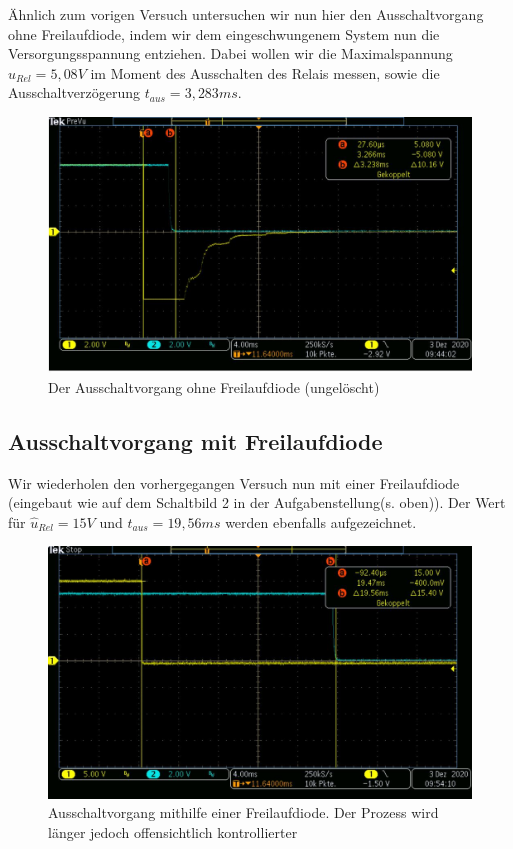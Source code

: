 \documentclass{article}
\begin{document}
Ähnlich zum vorigen Versuch untersuchen wir nun hier den Ausschaltvorgang ohne Freilaufdiode, indem wir dem eingeschwungenem System nun die 
Versorgungsspannung entziehen. Dabei wollen wir die Maximalspannung $\hat{u}_{Rel} = 5,08V$ im Moment des Ausschalten des Relais messen, sowie die Ausschaltverzögerung
$t_{aus} = 3,283ms$.

\begin{figure}[!h]
    \begin{center}
        \includegraphics[scale=0.45]{../assets/images/ET2P4/aufgabe2c.JPG}
        \caption{Der Ausschaltvorgang ohne Freilaufdiode (ungelöscht)}
    \end{center}
\end{figure}
\newpage
\subsection{Ausschaltvorgang mit Freilaufdiode}

Wir wiederholen den vorhergegangen Versuch nun mit einer Freilaufdiode (eingebaut wie auf dem Schaltbild 2 in der Aufgabenstellung(s. oben)). Der Wert für $\hat{u}_{Rel} = 15V$ und $t_{aus} = 19,56ms$ werden 
ebenfalls aufgezeichnet.

\begin{figure}[!h]
  \begin{center}
    \includegraphics[scale=0.45]{../assets/images/ET2P4/aufgabe2d.JPG}
    \caption{Ausschaltvorgang mithilfe einer Freilaufdiode. Der Prozess wird länger jedoch offensichtlich kontrollierter}
  \end{center}
\end{figure}
\end{document}
